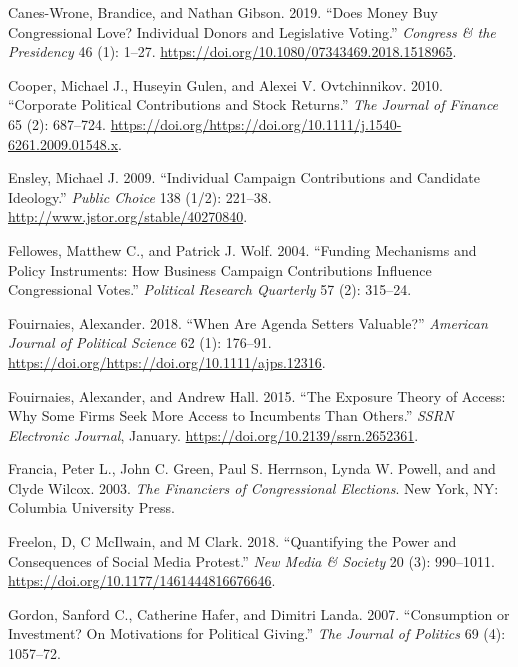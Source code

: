 \documentclass[12pt,]{article}
\begin{document}
\leavevmode\hypertarget{ref-caneswrone2019}{}%
Canes-Wrone, Brandice, and Nathan Gibson. 2019. ``Does Money Buy
Congressional Love? Individual Donors and Legislative Voting.''
\emph{Congress \& the Presidency} 46 (1): 1--27.
\url{https://doi.org/10.1080/07343469.2018.1518965}.

\leavevmode\hypertarget{ref-cooper2010}{}%
Cooper, Michael J., Huseyin Gulen, and Alexei V. Ovtchinnikov. 2010.
``Corporate Political Contributions and Stock Returns.'' \emph{The
Journal of Finance} 65 (2): 687--724.
\url{https://doi.org/https://doi.org/10.1111/j.1540-6261.2009.01548.x}.

\leavevmode\hypertarget{ref-ensley2009}{}%
Ensley, Michael J. 2009. ``Individual Campaign Contributions and
Candidate Ideology.'' \emph{Public Choice} 138 (1/2): 221--38.
\url{http://www.jstor.org/stable/40270840}.

\leavevmode\hypertarget{ref-fellowes2004}{}%
Fellowes, Matthew C., and Patrick J. Wolf. 2004. ``Funding Mechanisms
and Policy Instruments: How Business Campaign Contributions Influence
Congressional Votes.'' \emph{Political Research Quarterly} 57 (2):
315--24.

\leavevmode\hypertarget{ref-fouirnaies2018}{}%
Fouirnaies, Alexander. 2018. ``When Are Agenda Setters Valuable?''
\emph{American Journal of Political Science} 62 (1): 176--91.
\url{https://doi.org/https://doi.org/10.1111/ajps.12316}.

\leavevmode\hypertarget{ref-fouirnaies2015}{}%
Fouirnaies, Alexander, and Andrew Hall. 2015. ``The Exposure Theory of
Access: Why Some Firms Seek More Access to Incumbents Than Others.''
\emph{SSRN Electronic Journal}, January.
\url{https://doi.org/10.2139/ssrn.2652361}.

\leavevmode\hypertarget{ref-francia2003}{}%
Francia, Peter L., John C. Green, Paul S. Herrnson, Lynda W. Powell, and
and Clyde Wilcox. 2003. \emph{The Financiers of Congressional
Elections}. New York, NY: Columbia University Press.

\leavevmode\hypertarget{ref-freelon2018}{}%
Freelon, D, C McIlwain, and M Clark. 2018. ``Quantifying the Power and
Consequences of Social Media Protest.'' \emph{New Media \& Society} 20
(3): 990--1011. \url{https://doi.org/10.1177/1461444816676646}.

\leavevmode\hypertarget{ref-gordon2007}{}%
Gordon, Sanford C., Catherine Hafer, and Dimitri Landa. 2007.
``Consumption or Investment? On Motivations for Political Giving.''
\emph{The Journal of Politics} 69 (4): 1057--72.
\end{document}
